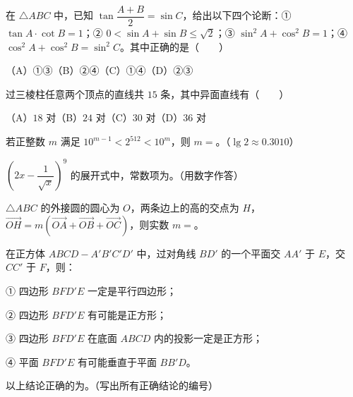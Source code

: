 \begin{question}
在 $\triangle ABC$ 中，已知 $\tan\dfrac{A+B}{2}=\sin C$，给出以下四个论断：① $\tan A\cdot\cot B=1$；② $0<\sin A+\sin B\leqslant\sqrt2$；③ $\sin^2A+\cos^2B=1$；④ $\cos^2A+\cos^2B=\sin^2C$。其中正确的是\mbox{（　　）}

（A）①③\quad（B）②④\quad（C）①④\quad（D）②③

\end{question}
\begin{question}
过三棱柱任意两个顶点的直线共 $15$ 条，其中异面直线有\mbox{（　　）}

（A）$18$ 对\quad（B）$24$ 对\quad（C）$30$ 对\quad（D）$36$ 对

\end{question}

\begin{question}
若正整数 $m$ 满足 $10^{m-1}<2^{512}<10^m$，则 $m=$\gkblank{}。（$\lg2\approx0.3010$）

\end{question}
\begin{question}
$\left(2x-\dfrac1{\sqrt{x}}\right)^9$ 的展开式中，常数项为\gkblank{}。（用数字作答）

\end{question}
\begin{question}
$\triangle ABC$ 的外接圆的圆心为 $O$，两条边上的高的交点为 $H$，$\overrightarrow{OH}=m(\overrightarrow{OA}+\overrightarrow{OB}+\overrightarrow{OC})$，则实数 $m=$\gkblank{}。

\end{question}
\begin{question}
在正方体 $ABCD-A'B'C'D'$ 中，过对角线 $BD'$ 的一个平面交 $AA'$ 于 $E$，交 $CC'$ 于 $F$，则：

① 四边形 $BFD'E$ 一定是平行四边形；

② 四边形 $BFD'E$ 有可能是正方形；

③ 四边形 $BFD'E$ 在底面 $ABCD$ 内的投影一定是正方形；

④ 平面 $BFD'E$ 有可能垂直于平面 $BB'D$。

以上结论正确的为\gkblank{}。（写出所有正确结论的编号）

\end{question}


